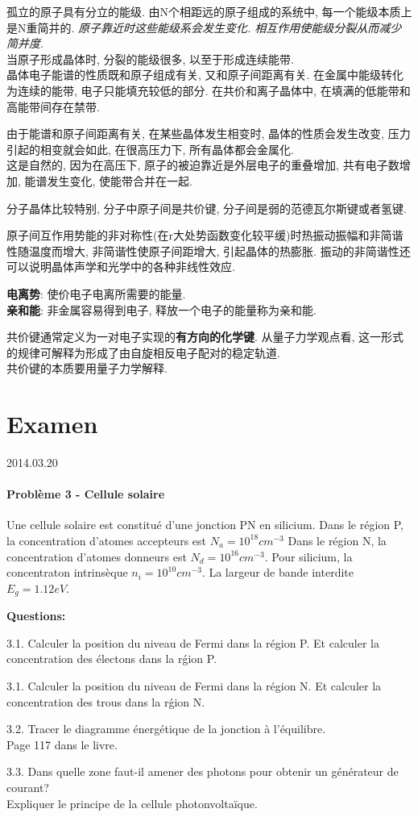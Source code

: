 \documentclass[openany]{article}
\begin{document}
孤立的原子具有分立的能级. 由N个相距远的原子组成的系统中, 每一个能级本质上是N重简并的. \emph{原子靠近时这些能级系会发生变化.  相互作用使能级分裂从而减少简并度}.\\
当原子形成晶体时, 分裂的能级很多, 以至于形成连续能带.\\
晶体电子能谱的性质既和原子组成有关, 又和原子间距离有关. 在金属中能级转化为连续的能带, 电子只能填充较低的部分. 在共价和离子晶体中, 在填满的低能带和高能带间存在禁带.

由于能谱和原子间距离有关, 在某些晶体发生相变时, 晶体的性质会发生改变, 压力引起的相变就会如此, 在很高压力下, 所有晶体都会金属化.\\
这是自然的, 因为在高压下, 原子的被迫靠近是外层电子的重叠增加, 共有电子数增加, 能谱发生变化, 使能带合并在一起.

分子晶体比较特别, 分子中原子间是共价键,
分子间是弱的范德瓦尔斯键或者氢键.

原子间互作用势能的非对称性(在r大处势函数变化较平缓)时热振动振幅和非简谐性随温度而增大,
非简谐性使原子间距增大, 引起晶体的热膨胀.
振动的非简谐性还可以说明晶体声学和光学中的各种非线性效应.

\textbf{电离势}: 使价电子电离所需要的能量.\\
\textbf{亲和能}: 非金属容易得到电子, 释放一个电子的能量称为亲和能.

共价键通常定义为一对电子实现的\textbf{有方向的化学键}. 从量子力学观点看, 这一形式的规律可解释为形成了由自旋相反电子配对的稳定轨道.\\
共价键的本质要用量子力学解释.

\section{Examen}
2014.03.20

\paragraph{Probl\`eme 3 - Cellule solaire}
Une cellule solaire est constitu\'e d'une jonction PN en silicium. 
Dans le r\'egion P, la concentration d'atomes accepteurs est $N_a = 10^{18} {cm}^{-3}$
Dans le r\'egion N, la concentration d'atomes donneurs est $N_d = 10^{16} {cm}^{-3}$.
Pour silicium, la concentraton intrins\`eque $n_i = 10^{10} cm^{-3}$.
La largeur de bande interdite $E_g  = 1.12 eV$.

\textbf{Questions:}

3.1. Calculer la position du niveau de Fermi dans la r\'egion P. Et calculer la concentration des \'electons dans la r\'gion P.

3.1. Calculer la position du niveau de Fermi dans la r\'egion N. Et calculer la concentration des trous dans la r\'gion N.

3.2. Tracer le diagramme \'energ\'etique de la jonction \`a l'\'equilibre.\\
Page 117 dans le livre.

3.3. Dans quelle zone faut-il amener des photons pour obtenir un g\'en\'erateur de courant?\\
Expliquer le principe de la cellule photonvolta\"ique.
\end{document}
